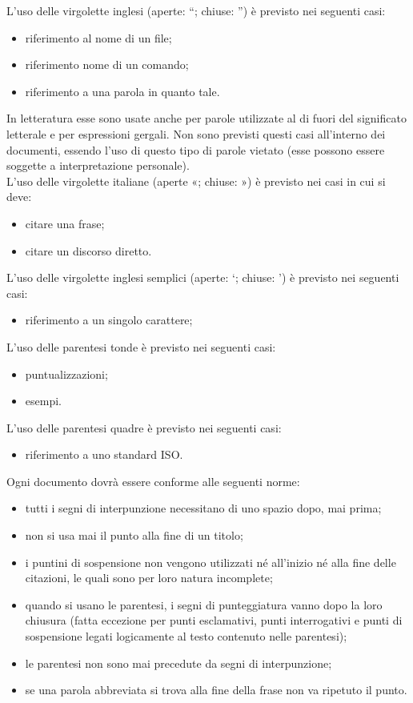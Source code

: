 						L’uso delle virgolette inglesi (aperte: “; chiuse: ”) è previsto nei seguenti casi:
						\begin{itemize}
							\item riferimento al nome di un file;
							\item riferimento nome di un comando;
							\item riferimento a una parola in quanto tale.
						\end{itemize}
						In letteratura esse sono usate anche per parole utilizzate al di fuori del significato letterale e per espressioni gergali. Non sono previsti questi casi all’interno dei documenti, essendo l’uso di questo tipo di parole vietato (esse possono essere soggette a interpretazione personale).\\
						L’uso delle virgolette italiane (aperte «; chiuse: ») è previsto nei casi in cui si deve:
						\begin{itemize}
							\item citare una frase;
							\item citare un discorso diretto.
						\end{itemize}
						L’uso delle virgolette inglesi semplici (aperte: ‘; chiuse: ’) è previsto nei seguenti casi:
						\begin{itemize}
							\item riferimento a un singolo carattere;
						\end{itemize}
						L’uso delle parentesi tonde è previsto nei seguenti casi:
						\begin{itemize}
							\item puntualizzazioni;
							\item esempi.
						\end{itemize}
						L’uso delle parentesi quadre è previsto nei seguenti casi:
						\begin{itemize}
							\item riferimento a uno standard ISO.
						\end{itemize}
						Ogni documento dovrà essere conforme alle seguenti norme:
						\begin{itemize}
							\item tutti i segni di interpunzione necessitano di uno spazio dopo, mai prima;
							\item non si usa mai il punto alla fine di un titolo;
							\item i puntini di sospensione non vengono utilizzati né all’inizio né alla fine delle citazioni, le quali sono per loro natura incomplete;
							\item quando si usano le parentesi, i segni di punteggiatura vanno dopo la loro chiusura (fatta eccezione per punti esclamativi, punti interrogativi e punti di sospensione legati logicamente al testo contenuto nelle parentesi);
							\item le parentesi non sono mai precedute da segni di interpunzione;
							\item se una parola abbreviata si trova alla fine della frase non va ripetuto il punto.
						\end{itemize}
